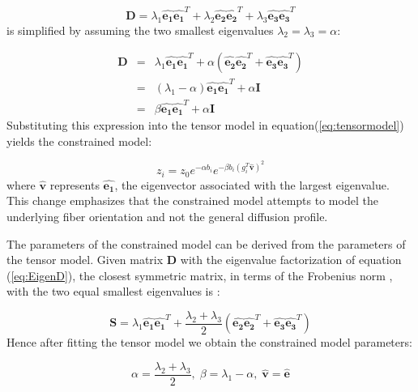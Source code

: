 \begin{equation} \label{eq:EigenD}
\mathbf{D} = \lambda_1 \mathbf{\hat{e_1}}\mathbf{\hat{e_1}}^T + 
\lambda_2 \mathbf{\hat{e_2}}\mathbf{\hat{e_2}}^T +
\lambda_3 \mathbf{\hat{e_3}}\mathbf{\hat{e_3}}^T
\end{equation}
%
%
is simplified by assuming the two smallest eigenvalues $\lambda_2 = \lambda_3 = \alpha $:

\begin{eqnarray} \label{eq:ConstrainedEigenD}
\mathbf{D} & = & \lambda_1 \mathbf{\hat{e_1}}\mathbf{\hat{e_1}}^T +
\alpha (\mathbf{\hat{e_2}}\mathbf{\hat{e_2}}^T + \mathbf{\hat{e_3}}\mathbf{\hat{e_3}}^T) \nonumber\\
& = & (\lambda_1 - \alpha) \mathbf{\hat{e_1}}\mathbf{\hat{e_1}}^T + \alpha\mathbf{I} \nonumber\\
& = & \beta\mathbf{\hat{e_1}}\mathbf{\hat{e_1}}^T + \alpha\mathbf{I}
\end{eqnarray}
%
%
Substituting this expression into the tensor model in equation(\ref{eq:tensormodel}) yields the constrained model:

\begin{equation} \label{eq:ConstrainedModel}
z_{i} = z_0 e^{-\alpha b_i} e^{-\beta b_i (g_i^T\mathbf{\hat{v}} ) ^2}
\end{equation}
%
%
where $\mathbf{\hat{v}}$ represents $\mathbf{\hat{e_1}}$, the eigenvector associated with the largest eigenvalue.  This change emphasizes that the constrained model attempts to model the underlying fiber orientation and not the general diffusion profile.

The parameters of the constrained model can be derived from the parameters of the tensor model.  Given matrix $\mathbf{D}$ with the eigenvalue factorization of equation (\ref{eq:EigenD}), the closest symmetric matrix, in terms of the Frobenius norm , with the two equal smallest eigenvalues is \cite{frimanTMI06}:

\begin{equation} \label{eq:derivedmatrix}
\mathbf{S} = \lambda_1 \mathbf{\hat{e_1}}\mathbf{\hat{e_1}}^T + 
\frac{\lambda_2 + \lambda_3}{2} (\mathbf{\hat{e_2}}\mathbf{\hat{e_2}}^T +
\mathbf{\hat{e_3}}\mathbf{\hat{e_3}}^T)
\end{equation}
%
%
Hence after fitting the tensor model we obtain the constrained model parameters:

\begin{equation} \label{eq:constrainedparams}
\alpha = \frac{\lambda_2 + \lambda_3}{2},\;
\beta = \lambda_1 - \alpha,\;
\mathbf{\hat{v}} = \mathbf{\hat{e}}
\end{equation}

